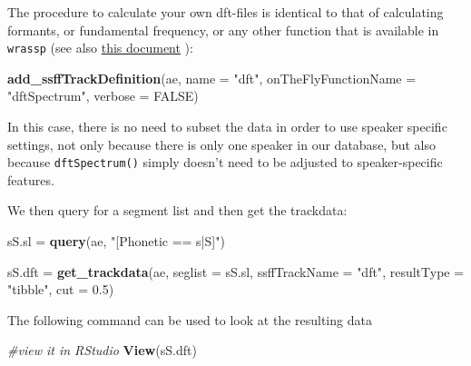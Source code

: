 \documentclass[]{book}
\newenvironment{Shaded}{\begin{snugshade}}{\end{snugshade}}
\newcommand{\CommentTok}[1]{\textcolor[rgb]{0.56,0.35,0.01}{\textit{#1}}}
\newcommand{\DataTypeTok}[1]{\textcolor[rgb]{0.13,0.29,0.53}{#1}}
\newcommand{\FloatTok}[1]{\textcolor[rgb]{0.00,0.00,0.81}{#1}}
\newcommand{\KeywordTok}[1]{\textcolor[rgb]{0.13,0.29,0.53}{\textbf{#1}}}
\newcommand{\NormalTok}[1]{#1}
\newcommand{\OtherTok}[1]{\textcolor[rgb]{0.56,0.35,0.01}{#1}}
\newcommand{\StringTok}[1]{\textcolor[rgb]{0.31,0.60,0.02}{#1}}
\begin{document}
The procedure to calculate your own dft-files is identical to that of calculating formants, or fundamental frequency, or any other function that is available in \texttt{wrassp} (see also \href{http://www.phonetik.uni-muenchen.de/\%7Ejmh/lehre/sem/ws1819/emuR/LESSON4/Signal_Data_Calculation_Extraction_Plotting.html}{this document} ):

\begin{Shaded}
\begin{Highlighting}[]
\KeywordTok{add_ssffTrackDefinition}\NormalTok{(ae,}
                        \DataTypeTok{name =} \StringTok{"dft"}\NormalTok{,}
                        \DataTypeTok{onTheFlyFunctionName =} \StringTok{"dftSpectrum"}\NormalTok{,}
                        \DataTypeTok{verbose =} \OtherTok{FALSE}\NormalTok{)}
\end{Highlighting}
\end{Shaded}

In this case, there is no need to subset the data in order to use speaker specific settings, not only because there is only one speaker in our database, but also because \texttt{dftSpectrum()} simply doesn't need to be adjusted to speaker-specific features.

We then query for a segment list and then get the trackdata:

\begin{Shaded}
\begin{Highlighting}[]
\NormalTok{sS.sl =}\StringTok{ }\KeywordTok{query}\NormalTok{(ae, }
              \StringTok{"[Phonetic == s|S]"}\NormalTok{)}

\NormalTok{sS.dft =}\StringTok{ }\KeywordTok{get_trackdata}\NormalTok{(ae, }
                       \DataTypeTok{seglist =}\NormalTok{ sS.sl, }
                       \DataTypeTok{ssffTrackName =} \StringTok{"dft"}\NormalTok{, }
                       \DataTypeTok{resultType =} \StringTok{"tibble"}\NormalTok{,}
                       \DataTypeTok{cut =} \FloatTok{0.5}\NormalTok{) }
\end{Highlighting}
\end{Shaded}

The following command can be used to look at the resulting data

\begin{Shaded}
\begin{Highlighting}[]
\CommentTok{#view it in RStudio}
\KeywordTok{View}\NormalTok{(sS.dft)}
\end{Highlighting}
\end{Shaded}
\end{document}
